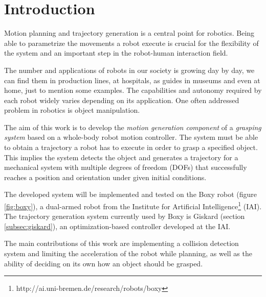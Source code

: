

\chapter{\textbf{Introduction}}

Motion planning and trajectory generation is a central point for robotics. Being able to parametrize the movements a robot execute is crucial for the flexibility of the system and an important step in the robot-human interaction field.

The number and applications of robots in our society is growing day by day, we can find them in production lines, at hospitals, as guides in museums and even at home, just to mention some examples. The capabilities and autonomy required by each robot widely varies depending on its application. One often addressed problem in robotics is object manipulation.

The aim of this work is to develop the \textit{motion generation component} of a \textit{grasping system} based on a whole-body robot motion controller. The system must be able to obtain a trajectory a robot has to execute in order to grasp a specified object. This implies the system detects the object and generates a trajectory for a mechanical system with multiple degrees of freedom (DOFs) that successfully reaches a position and orientation under given initial conditions.

The developed system will be implemented and tested on the Boxy robot (figure \ref{fig:boxy}), a dual-armed robot from the Institute for Artificial Intelligence\footnote{http://ai.uni-bremen.de/research/robots/boxy} (IAI). The trajectory generation system currently used by Boxy is Giskard (section \ref{subsec:giskard}), an optimization-based controller developed at the IAI. 

The main contributions of this work are implementing a collision detection system and limiting the acceleration of the robot while planning, as well as the ability of deciding on its own how an object should be grasped.

